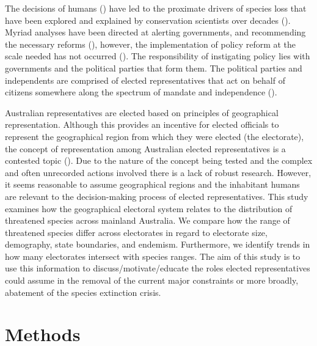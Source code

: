 \documentclass[a4paper,11pt]{article}
\begin{document}
The decisions of humans (\cite{rydenLinkingDemocracyBiodiversity2020, dalbyAnthropoceneFormationsEnvironmental2017a,burkeSpeciesBordersPolitical2020}) have led to the proximate drivers of species loss that have been explored and explained by conservation scientists over decades (\cite{kearneyThreatsAustraliaImperilled2019,allekThreatsEndangeringAustralia2018}). Myriad analyses have been directed at alerting governments, and recommending the necessary reforms (\cite{hawkeReportIndependentReview2009,samuelIndependentReviewEPBC2020,mcdonaldImprovingPolicyEfficiency2015}), however, the implementation of policy reform at the scale needed has not occurred (\cite{woinarskiContributionPolicyLaw2017,resideHowSendFinch2019}). The responsibility of instigating policy lies with governments and the political parties that form them. The political parties and independents are comprised of elected representatives that act on behalf of citizens somewhere along the spectrum of mandate and independence (\cite{pitkinConceptRepresentation1972,rohrschneiderIntroductionPoliticalRepresentation2020}).

Australian representatives are elected based on principles of geographical representation. Although this provides an incentive for elected officials to represent the geographical region from which they were elected (the electorate), the concept of representation among Australian elected representatives is a contested topic (\cite{brentonWhatLiesWork2010}). Due to the nature of the concept being tested and the complex and often unrecorded actions involved there is a lack of robust research. However, it seems reasonable to assume geographical regions and the inhabitant humans are relevant to the decision-making process of elected representatives. This study examines how the geographical electoral system relates to the distribution of threatened species across mainland Australia. We compare how the range of threatened species differ across electorates in regard to electorate size, demography, state boundaries, and endemism. Furthermore, we identify trends in how many electorates intersect with species ranges. The aim of this study is to use this information to discuss/motivate/educate the roles elected representatives could assume in the removal of the current major constraints or more broadly, abatement of the species extinction crisis.

\section{Methods}
\end{document}
